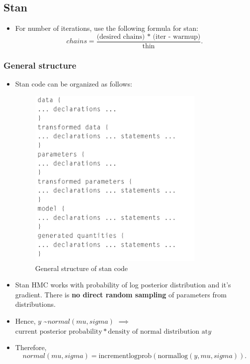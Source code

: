 \documentclass[a4paper]{article}
\begin{document}
\subsection{Stan}
\begin{itemize}
    \item For number of iterations, use the following formula for stan:
    \[
        chains = \frac{\text{(desired chains) * (iter - warmup)}}{\text{thin}}
    .\] 
\end{itemize}
\subsubsection{General structure}
\begin{itemize}
    \item Stan code can be organized as follows:
    \begin{figure}[H]
        \centering
        \includegraphics[width=0.8\textwidth]{stan_structure}
        \caption{General structure of stan code}
        \label{fig:stan_structure}
    \end{figure} 
    \item Stan HMC works with probability of log posterior distribution and it's gradient. There is \textbf{no direct random sampling} of parameters from distributions.   
    \item Hence, $y$ \textasciitilde $normal(mu, sigma)$ $\implies$ $\text{current posterior probability} * \text{density of normal distribution at} y$
    \item Therefore,
    \[
        normal(mu, sigma) = \text{incrementlogprob}(\text{normallog}(y, mu, sigma))
    .\] 
\end{itemize}
\end{document}
